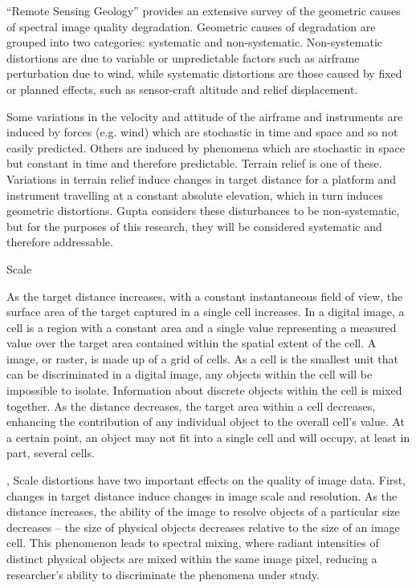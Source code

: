 \documentclass[10pt]{article}
\begin{document}
``Remote Sensing Geology'' \cite{Gupta2018} provides an extensive survey of the geometric causes of spectral image quality degradation. Geometric causes of degradation are grouped into two categories: systematic and non-systematic. Non-systematic distortions are due to variable or unpredictable factors such as airframe perturbation due to wind, while systematic distortions are those caused by fixed or planned effects, such as sensor-craft altitude and relief displacement.

Some variations in the velocity and attitude of the airframe and instruments are induced by forces (e.g. wind) which are stochastic in time and space and so not easily predicted. Others are induced by phenomena which are stochastic in space but constant in time and therefore predictable. Terrain relief is one of these. Variations in terrain relief induce changes in target distance for a platform and instrument travelling at a constant absolute elevation, which in turn induces geometric distortions. Gupta \cite{Gupta2018} considers these disturbances to be non-systematic, but for the purposes of this research, they will be considered systematic and therefore addressable.

Scale

As the target distance increases, with a constant instantaneous field of view, the surface area of the target captured in a single cell increases. In a digital image, a cell is a region with a constant area and a single value representing a measured value over the target area contained within the spatial extent of the cell. A image, or raster, is made up of a grid of cells. As a cell is the smallest unit that can be discriminated in a digital image, any objects within the cell will be impossible to isolate. Information about discrete objects within the cell is mixed together. As the distance decreases, the target area within a cell decreases, enhancing the contribution of any individual object to the overall cell's value. At a certain point, an object may not fit into a single cell and will occupy, at least in part, several cells. 


, Scale distortions have two important effects on the quality of image data. First, changes in target distance induce changes in image scale and resolution. As the distance increases, the ability of the image to resolve objects of a particular size decreases -- the size of physical objects decreases relative to the size of an image cell. This phenomenon leads to spectral mixing, where radiant intensities of distinct physical objects are mixed within the same image pixel, reducing a researcher's ability to discriminate the phenomena under study.
\end{document}
